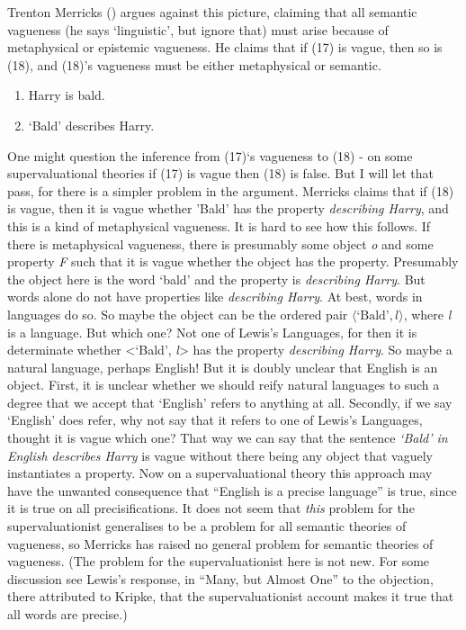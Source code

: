\documentclass[
  11pt,
  letterpaper,
  DIV=11,
  numbers=noendperiod,
  oneside]{scrartcl}
\begin{document}
Trenton Merricks () argues against this
picture, claiming that all semantic vagueness (he says `linguistic', but
ignore that) must arise because of metaphysical or epistemic vagueness.
He claims that if (17) is vague, then so is (18), and (18)'s vagueness
must be either metaphysical or semantic.

\begin{enumerate}
\def\labelenumi{\arabic{enumi}.}
\item
  Harry is bald.
\item
  `Bald' describes Harry.
\end{enumerate}

One might question the inference from (17)`s vagueness to (18) - on some
supervaluational theories if (17) is vague then (18) is false. But I
will let that pass, for there is a simpler problem in the argument.
Merricks claims that if (18) is vague, then it is vague whether 'Bald'
has the property \emph{describing Harry}, and this is a kind of
metaphysical vagueness. It is hard to see how this follows. If there is
metaphysical vagueness, there is presumably some object \emph{o} and
some property \emph{F} such that it is vague whether the object has the
property. Presumably the object here is the word `bald' and the property
is \emph{describing Harry}. But words alone do not have properties like
\emph{describing Harry}. At best, words in languages do so. So maybe the
object can be the ordered pair \(\langle \text{`Bald'}, l \rangle\),
where \emph{l} is a language. But which one? Not one of Lewis's
Languages, for then it is determinate whether \textless{}`Bald',
\emph{l}\textgreater{} has the property \emph{describing Harry}. So
maybe a natural language, perhaps English! But it is doubly unclear that
English is an object. First, it is unclear whether we should reify
natural languages to such a degree that we accept that `English' refers
to anything at all. Secondly, if we say `English' does refer, why not
say that it refers to one of Lewis's Languages, thought it is vague
which one? That way we can say that the sentence \emph{`Bald' in English
describes Harry} is vague without there being any object that vaguely
instantiates a property. Now on a supervaluational theory this approach
may have the unwanted consequence that ``English is a precise language''
is true, since it is true on all precisifications. It does not seem that
\emph{this} problem for the supervaluationist generalises to be a
problem for all semantic theories of vagueness, so Merricks has raised
no general problem for semantic theories of vagueness. (The problem for
the supervaluationist here is not new. For some discussion see Lewis's
response, in ``Many, but Almost One'' to the objection, there attributed
to Kripke, that the supervaluationist account makes it true that all
words are precise.)
\end{document}
